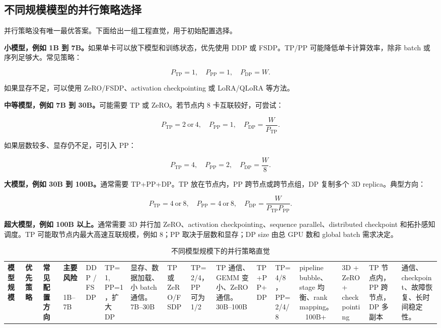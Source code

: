 \subsection{不同规模模型的并行策略选择}
\label{subsec:parallel-strategy-for-different-model-sizes}

并行策略没有唯一最优答案。下面给出一组工程直觉，用于初始配置选择。

\textbf{小模型，例如 1B 到 7B。}如果单卡可以放下模型和训练状态，优先使用 DDP 或 FSDP。TP/PP 可能降低单卡计算效率，除非 batch 或序列足够大。常见策略：

\[
P_{\mathrm{TP}}=1,\quad
P_{\mathrm{PP}}=1,\quad
P_{\mathrm{DP}}=W.
\]

如果显存不足，可以使用 ZeRO/FSDP、activation checkpointing 或 LoRA/QLoRA 等方法。

\textbf{中等模型，例如 7B 到 30B。}可能需要 TP 或 ZeRO。若节点内 8 卡互联较好，可尝试：

\[
P_{\mathrm{TP}}=2\ \text{or}\ 4,
\quad
P_{\mathrm{PP}}=1,
\quad
P_{\mathrm{DP}}=\frac{W}{P_{\mathrm{TP}}}.
\]

如果层数较多、显存仍不足，可引入 PP：

\[
P_{\mathrm{TP}}=4,
\quad
P_{\mathrm{PP}}=2,
\quad
P_{\mathrm{DP}}=\frac{W}{8}.
\]

\textbf{大模型，例如 30B 到 100B。}通常需要 TP+PP+DP。TP 放在节点内，PP 跨节点或跨节点组，DP 复制多个 3D replica。典型方向：

\[
P_{\mathrm{TP}}=4\ \text{or}\ 8,
\quad
P_{\mathrm{PP}}=4\ \text{or}\ 8,
\quad
P_{\mathrm{DP}}=\frac{W}{P_{\mathrm{TP}}P_{\mathrm{PP}}}.
\]

\textbf{超大模型，例如 100B 以上。}通常需要 3D 并行加 ZeRO、activation checkpointing、sequence parallel、distributed checkpoint 和拓扑感知调度。TP 可能取节点内最大高速互联规模，例如 8；PP 取决于层数和显存；DP size 由总 GPU 数和 global batch 需求决定。

\begin{table}[H]
\centering
\small
\caption{不同模型规模下的并行策略直觉}
\label{tab:parallel-strategy-by-model-size}
\begin{tabular}{p{}p{}p{}p{}}
\toprule
\textbf{模型规模} & \textbf{优先策略} & \textbf{常见配置方向} & \textbf{主要风险} \
\midrule
1B--7B
& DDP / FSDP
& TP=1, PP=1，扩大 DP
& 显存、数据加载、小 batch 通信。 \
\midrule
7B--30B
& TP 或 ZeRO/FSDP
& TP=2/4，PP 可为 1/2
& TP 通信、GEMM 变小、ZeRO 通信。 \
\midrule
30B--100B
& TP+PP+DP
& TP=4/8，PP=2/4/8
& pipeline bubble、stage 均衡、rank mapping。 \
\midrule
100B+
& 3D + ZeRO + checkpointing
& TP 节点内，PP 跨节点，DP 多副本
& 通信、checkpoint、故障恢复、长时间稳定性。 \
\bottomrule
\end{tabular}
\end{table}


